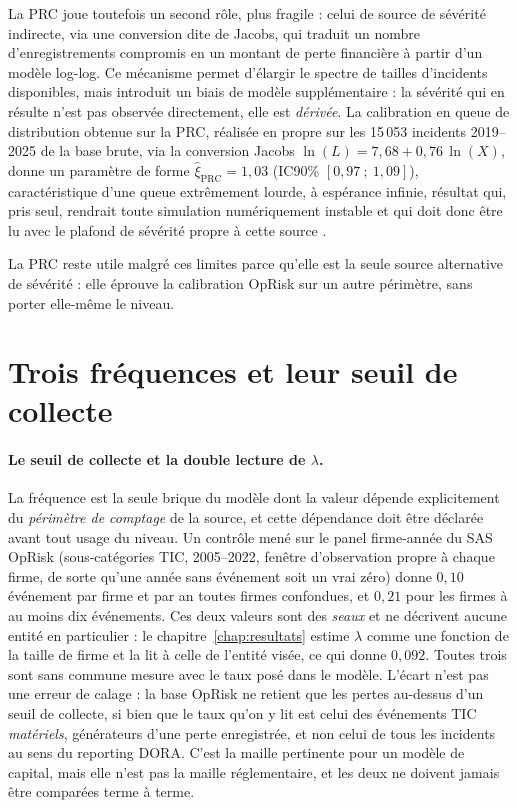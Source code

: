 La PRC joue toutefois un second rôle, plus fragile : celui de source de
sévérité indirecte, via une conversion dite de Jacobs, qui traduit un nombre
d'enregistrements compromis en un montant de perte financière à partir d'un
modèle log-log. Ce mécanisme permet d'élargir le spectre de tailles
d'incidents disponibles, mais introduit un biais de modèle supplémentaire :
la sévérité qui en résulte n'est pas observée directement, elle est
\emph{dérivée}. La calibration en queue de distribution obtenue sur la PRC,
réalisée en propre sur les 15\,053 incidents 2019--2025 de la base brute,
via la conversion Jacobs $\ln(L) = 7{,}68 + 0{,}76\,\ln(X)$, donne un
paramètre de forme $\hat{\xi}_{\text{PRC}} = 1{,}03$ (IC90\%
$[0{,}97~;~1{,}09]$), caractéristique d'une queue extrêmement lourde, à
espérance infinie, résultat qui, pris seul, rendrait toute simulation
numériquement instable et qui doit donc être lu avec le plafond de sévérité
propre à cette source \matcomp.

La PRC reste utile malgré ces limites parce qu'elle est la seule source
alternative de sévérité : elle éprouve la calibration OpRisk sur un autre
périmètre, sans porter elle-même le niveau.


\section{Trois fréquences et leur seuil de collecte}


\paragraph{Le seuil de collecte et la double lecture de $\lambda$.}
La fréquence est la seule brique du modèle dont la valeur dépende
explicitement du \emph{périmètre de comptage} de la source, et cette dépendance
doit être déclarée avant tout usage du niveau. Un contrôle mené sur le panel
firme-année du SAS OpRisk (sous-catégories TIC, 2005--2022, fenêtre
d'observation propre à chaque firme, de sorte qu'une année sans événement soit
un vrai zéro) donne $0{,}10$ événement par firme et par an toutes firmes
confondues, et $0{,}21$ pour les firmes à au moins dix événements. Ces deux
valeurs sont des \emph{seaux} et ne décrivent aucune entité en particulier : le
chapitre~\ref{chap:resultats} estime $\lambda$ comme une fonction de la taille de
firme et la lit à celle de l'entité visée, ce qui donne $0{,}092$. Toutes trois
sont sans commune mesure avec le taux posé dans le modèle. L'écart n'est pas une erreur de
calage : la base OpRisk ne retient que les pertes au-dessus d'un seuil
de collecte, si bien que le taux qu'on y lit est celui des événements TIC
\emph{matériels}, générateurs d'une perte enregistrée, et non celui de tous les
incidents au sens du reporting DORA. C'est la maille pertinente pour un modèle
de capital, mais elle n'est pas la maille réglementaire, et les deux ne doivent
jamais être comparées terme à terme.

